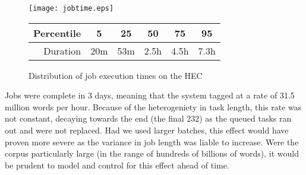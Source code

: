 % 
% 
% 
% 
% 

\begin{figure}[h]
    \centering
    \texttt{[image: jobtime.eps]}

    \begin{tabular}{ | r | c | c | c | c | c | }
        \hline
        Percentile & 5 & 25 & 50 & 75 & 95 \\ \hline
        Duration & 20m & 53m & 2.5h & 4.5h & 7.3h \\ \hline
    \end{tabular}

    \caption{Distribution of job execution times on the HEC}
    \label{fig:jobtimes}
\end{figure}


% 
% 
% 
% 




Jobs were complete in 3 days, meaning that the system tagged at a rate of 31.5 million words 
per hour.  Because of the heterogeniety in task length, this rate was not constant, decaying towards the end (the final 232) as the queued tasks ran out and were not replaced.  Had we used larger batches, this effect would have proven more severe as the variance in job length was liable to increase.  Were the corpus particularly large (in the range of hundreds of billions of words), it would be prudent to model and control for this effect ahead of time.

